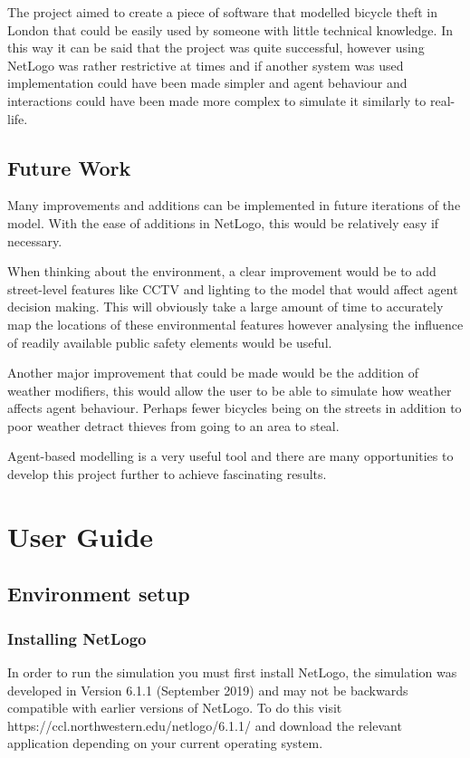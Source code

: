 \documentclass[11pt]{informatics-report}
\begin{document}
The project aimed to create a piece of software that modelled bicycle theft in London that could be easily used by someone with little technical knowledge. In this way it can be said that the project was quite successful, however using NetLogo was rather restrictive at times and if another system was used implementation could have been made simpler and agent behaviour and interactions could have been made more complex to simulate it similarly to real-life.

\section{Future Work}
Many improvements and additions can be implemented in future iterations of the model. With the ease of additions in NetLogo, this would be relatively easy if necessary. \par

When thinking about the environment, a clear improvement would be to add street-level features like CCTV and lighting to the model that would affect agent decision making. This will obviously take a large amount of time to accurately map the locations of these environmental features however analysing the influence of readily available public safety elements would be useful. \par

Another major improvement that could be made would be the addition of weather modifiers, this would allow the user to be able to simulate how weather affects agent behaviour. Perhaps fewer bicycles being on the streets in addition to poor weather detract thieves from going to an area to steal. \par

Agent-based modelling is a very useful tool and there are many opportunities to develop this project further to achieve fascinating results.
\cleardoublepage
{}
\printbibliography

\appendix
\chapter{User Guide}
\section{Environment setup}
\subsection{Installing NetLogo}
In order to run the simulation you must first install NetLogo, the simulation was developed in Version 6.1.1 (September 2019) and may not be backwards compatible with earlier versions of NetLogo. To do this visit https://ccl.northwestern.edu/netlogo/6.1.1/ and download the relevant application depending on your current operating system. 
\end{document}
